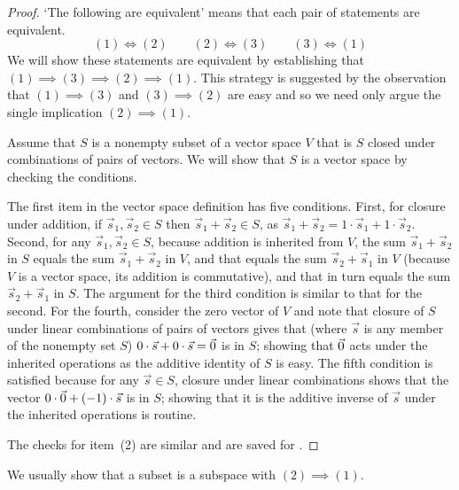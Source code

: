 \begin{proof}
`The following are equivalent' means that each pair of 
statements are equivalent.
\begin{equation*}
  (1)\!\iff\!(2)
  \qquad
  (2)\!\iff\!(3)
  \qquad
  (3)\!\iff\!(1)
\end{equation*}
We will show these statements are equivalent by establishing that
\( (1)\implies (3)\implies (2)\implies (1)\).
This strategy is suggested by the observation that
\( (1)\implies (3) \) and \( (3)\implies (2) \) are easy and so we need only
argue the single implication \( (2)\implies (1) \).

Assume that \( S \) is a nonempty subset of a vector space
$V$ that is $S$ closed under combinations of pairs of vectors.
We will show that $S$ is a vector space by checking the conditions.

The first item in the vector space definition has five conditions.
First, for closure under addition, if
\( \vec{s}_1,\vec{s}_2\in S \) then \( \vec{s}_1+\vec{s}_2\in S \),
as \( \vec{s}_1+\vec{s}_2=1\cdot\vec{s}_1+1\cdot\vec{s}_2 \).
Second, for any \( \vec{s}_1,\vec{s}_2\in S \), because addition
is inherited from \( V \), the sum \( \vec{s}_1+\vec{s}_2 \)
in \( S \) equals the sum \( \vec{s}_1+\vec{s}_2 \)
in \( V \), and that equals the sum \( \vec{s}_2+\vec{s}_1 \) in
\( V \) (because $V$ is a vector space, its addition is commutative), 
and that in turn equals the sum \( \vec{s}_2+\vec{s}_1 \) in \( S \).
The argument for the third condition is similar to that for the second.
For the fourth, consider the zero vector of \( V \) and note that 
closure of $S$ under linear combinations of pairs of vectors gives that 
(where \( \vec{s} \) is any member of the nonempty set \( S \))
\( 0\cdot\vec{s}+0\cdot\vec{s}=\vec{0} \) is in $S$;
showing that \( \vec{0} \) acts under the inherited operations as the additive
identity of \( S \) is easy.
The fifth condition is satisfied because for any \( \vec{s}\in S \),
closure under linear combinations shows that the vector
\( 0\cdot\vec{0}+(-1)\cdot\vec{s} \) is in \( S \); showing that it is the
additive inverse of \( \vec{s} \) under the inherited operations is
routine.

The checks for item~(2) are similar and are saved for
.
\end{proof}

We usually show that a subset is a subspace with \( (2)\implies (1) \).

